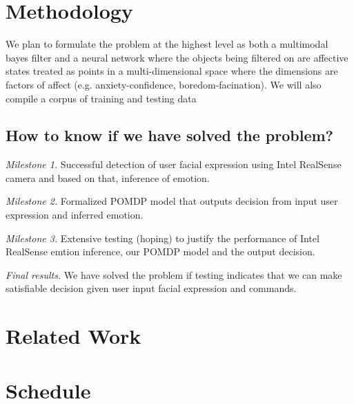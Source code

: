 \documentclass[12pt,letterpaper]{article}
\begin{document}
\section{Methodology}
We plan to formulate the problem at the highest level as both a multimodal bayes filter and a neural network where the objects being filtered on are affective states treated as points in a multi-dimensional space where the dimensions are factors of affect (e.g. anxiety-confidence, boredom-facination).  We will also compile a corpus of training and testing data 


\subsection{How to know if we have solved the problem?}
\emph{Milestone 1.} Successful detection of user facial expression using Intel RealSense camera and based on that, inference of emotion.

\emph{Milestone 2.} Formalized POMDP model that outputs decision from input user expression and inferred emotion.

\emph{Milestone 3.} Extensive testing (hoping) to justify the performance of Intel RealSense emtion inference, our POMDP model and the output decision.

\emph{Final results.} We have solved the problem if testing indicates that we can make satisfiable decision given user input facial expression and commands. 
\section{Related Work}



\newpage
\section{Schedule}
\end{document}
